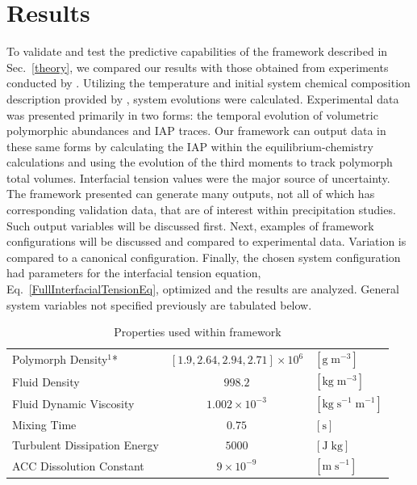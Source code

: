 \documentclass[preprint,3p,a4paper,times,12pt,authoryear]{elsarticle}
\begin{document}
\section{Results}
\label{Results_Section}
To validate and test the predictive capabilities of the framework described in Sec.~\ref{theory}, we compared our results with those obtained from experiments conducted by \citet{Ogino1987}.  Utilizing the temperature and initial system chemical composition description provided by \citeauthor{Ogino1987}, system evolutions were calculated.  Experimental data was presented primarily in two forms: the temporal evolution of volumetric polymorphic abundances and IAP traces.  Our framework can output data in these same forms by calculating the IAP within the equilibrium-chemistry calculations and using the evolution of the third moments to track polymorph total volumes.  Interfacial tension values were the major source of uncertainty.  The framework presented can generate many outputs, not all of which has corresponding validation data, that are of interest within precipitation studies.  Such output variables will be discussed first.  Next, examples of framework configurations will be discussed and compared to experimental data.   Variation is compared to a canonical configuration.  Finally, the chosen system configuration had parameters for the interfacial tension equation, Eq.~\ref{FullInterfacialTensionEq}, optimized and the results are analyzed.  General system variables not specified previously are tabulated below.

\begin{table}[ht]
\caption{Properties used within framework}
\centering
\begin{tabular}{ p{5cm} | c | p{2cm}  }
\hline\hline
Polymorph Density$^1$* & $[1.9, 2.64, 2.94, 2.71] \times 10^6 $ & $ [\text{g} \; \text{m}^{-3}]$     \\
Fluid Density & $998.2 $ & $ [\text{kg} \; \text{m}^{-3}]$  \\
Fluid Dynamic Viscosity & $1.002\times 10^{-3} $ & $ [\text{kg} \; \text{s}^{-1} \; \text{m}^{-1}]$    \\
Mixing Time & $0.75$ & $[ \text{s} ]$  \\
Turbulent Dissipation Energy & $5000$ & $[ \text{J} \; \text{kg}  ]$  \\
ACC Dissolution Constant & $9\times 10^{-9}$ & $[\text{m} \; \text{s}^{-1}]$ \\
\hline
\end{tabular}
 \hspace{2cm}
\label{properties_table}
\end{table}
\end{document}
